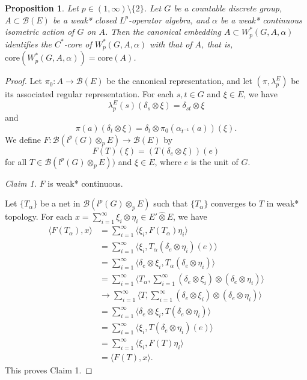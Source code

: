 \documentclass[reqno,11pt]{amsart}
\theoremstyle{plain}
\newtheorem{prop}[thm]{Proposition}
\theoremstyle{definition}
\theoremstyle{remark}
\newcommand{\la}{\langle}
\newcommand{\ra}{\rangle}
\begin{document}
\begin{prop}\label{core1}
Let $p\in (1,\infty)\setminus\{2\}$. Let $G$ be a countable discrete group, $A\subset \mathcal{B}(E)$ be a weak* closed $L^p$-operator algebra, and $\alpha$ be a weak* continuous isometric action of $G$ on $A$. Then the canonical embedding $A\subset W^*_p(G,A,\alpha)$ identifies the $C^*$-core of $W^*_p(G,A,\alpha)$ with that of $A$, that is,
$\mathrm{core}(W^*_p(G,A,\alpha))=\mathrm{core}(A)$.
\end{prop}
\begin{proof}
Let $\pi_0:A\rightarrow \mathcal{B}(E)$ be the canonical representation, and let $(\pi,\lambda_p^E)$ be its associated regular representation.
For each $s,t\in G$ and $\xi\in E$,
we have $$\lambda_p^E(s)(\delta_s\otimes\xi)=\delta_{st}\otimes\xi$$ and $$\pi(a)(\delta_t\otimes\xi)=\delta_t\otimes \pi_0(\alpha_{t^{-1}}(a))(\xi).$$
We define $F:\mathcal{B}(l^p(G)\otimes_p E)\rightarrow \mathcal{B}(E)$ by $$F(T)(\xi)=(T(\delta_e\otimes\xi))(e)$$ for all $T\in \mathcal{B}(l^p(G)\otimes_p E))$ and $\xi\in E$, where $e$ is the unit of $G$.

{\it Claim 1.} $F$ is weak* continuous.

Let $\{T_\alpha\}$ be a net in $\mathcal{B}(l^p(G)\otimes_p E)$ such that $\{T_\alpha\}$ converges to $T$ in weak* topology.
For each $x=\sum_{i=1}^\infty \xi_i\otimes\eta_i\in E'\widehat{\otimes}E$, we have
$$\begin{aligned} \la F(T_\alpha),x\ra
&=\sum_{i=1}^\infty \la \xi_i, F(T_\alpha)\eta_i\ra\\
&=\sum_{i=1}^\infty \la \xi_i, T_\alpha(\delta_e\otimes\eta_i)(e)\ra\\
&=\sum_{i=1}^\infty \la \delta_e\otimes \xi_i,T_\alpha(\delta_e\otimes\eta_i) \ra \\
&=\sum_{i=1}^\infty \la T_\alpha, \sum_{i=1}^\infty (\delta_e\otimes\xi_i)\otimes (\delta_e\otimes\eta_i) \ra \\
&\rightarrow \sum_{i=1}^\infty \la T, \sum_{i=1}^\infty (\delta_e\otimes\xi_i)\otimes (\delta_e\otimes\eta_i) \ra \\
&=\sum_{i=1}^\infty \la \delta_e\otimes \xi_i,T(\delta_e\otimes\eta_i) \ra \\
&=\sum_{i=1}^\infty \la \xi_i, T(\delta_e\otimes\eta_i)(e)\ra\\
&=\sum_{i=1}^\infty \la \xi_i, F(T)\eta_i\ra\\
&=\la F(T),x\ra.
\end{aligned}$$
This proves Claim 1.


\end{proof}
\end{document}

